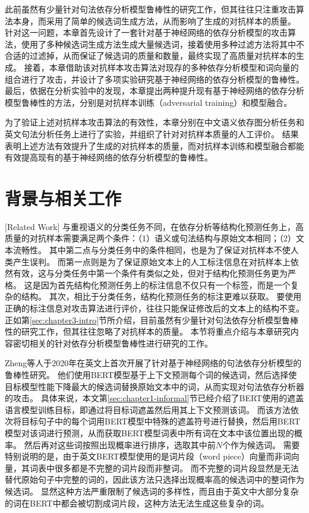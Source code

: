 此前虽然有少量针对句法依存分析模型鲁棒性的研究工作，但其往往只注重攻击算法本身，而采用了简单的候选词生成方法，从而影响了生成的对抗样本的质量。
针对这一问题，本章首先设计了一套针对基于神经网络的依存分析模型的攻击算法，使用了多种候选词生成方法生成大量候选词，接着使用多种过滤方法将其中不合适的过滤掉，从而保证了候选词的质量和数量，最终实现了高质量对抗样本的生成。
接着，本章借助该对抗样本攻击算法对现存的多种依存分析模型和词向量的组合进行了攻击，并设计了多项实验研究基于神经网络的依存分析模型的鲁棒性。
最后，依据在分析实验中的发现，本章提出两种提升现有基于神经网络的依存分析模型鲁棒性的方法，分别是对抗样本训练（adversarial training）和模型融合。

为了验证上述对抗样本攻击算法的有效性，本章分别在中文语义依存图分析任务和英文句法分析任务上进行了实验，并组织了针对对抗样本质量的人工评价。
结果表明上述方法有效提升了生成的对抗样本的质量，而对抗样本训练和模型融合都能有效提高现有的基于神经网络的依存分析模型的鲁棒性。

\section{背景与相关工作}[Related Work]
\label{sec:chapter3-related-work}
与重视语义的分类任务不同，在依存分析等结构化预测任务上，高质量的对抗样本需要满足两个条件：（1）语义或句法结构与原始文本相同；（2）文本流畅性。
其中第二点与分类任务中的条件相同，也是为了保证对抗样本不使人类产生误判。
而第一点则是为了保证原始文本上的人工标注信息在对抗样本上依然有效，这与分类任务中第一个条件有类似之处，但对于结构化预测任务更为严格。
这是因为首先结构化预测任务上的标注信息不仅只有一个标签，而是一个复杂的结构。
其次，相比于分类任务，结构化预测任务的标注更难以获取。
要使用正确的标注信息对攻击算法进行评价，往往只能保证修改后的文本上的结构不变。
正如第\ref{sec:chapter3-intro}节所介绍，目前虽然有少量针对句法依存分析模型鲁棒性的研究工作，但其往往忽略了对抗样本的质量。
本节将重点介绍与本章研究内容密切相关的针对依存分析模型鲁棒性进行研究的工作。

Zheng等人\cite{zheng-etal-2020-evaluating}于2020年在英文上首次开展了针对基于神经网络的句法依存分析模型的鲁棒性研究。
他们使用BERT模型基于上下文预测每个词的候选词，然后选择使目标模型性能下降最大的候选词替换原始文本中的词，从而实现对句法依存分析器的攻击。
具体来说，本文第\ref{sec:chapter1-informal}节已经介绍了BERT使用的遮盖语言模型训练目标，即通过将目标词遮盖然后用其上下文预测该词。
而该方法依次将目标句子中的每个词用BERT模型中特殊的遮盖符号进行替换，然后用BERT模型对该词进行预测，从而获取BERT模型词表中所有词在文本中该位置出现的概率。
然后再对这些词按照出现概率进行排序，选取其中前$N$个作为候选词。
需要特别说明的是，由于英文BERT模型使用的是词片段（word piece）向量而非词向量，其词表中很多都是不完整的词片段而非整词。
而不完整的词片段显然是无法替代原始句子中完整的词的，因此该方法只选择出现概率高的候选词中的整词作为候选词。
显然这种方法严重限制了候选词的多样性，而且由于英文中大部分复杂的词在BERT中都会被切割成词片段，这种方法无法生成这些复杂的词。

